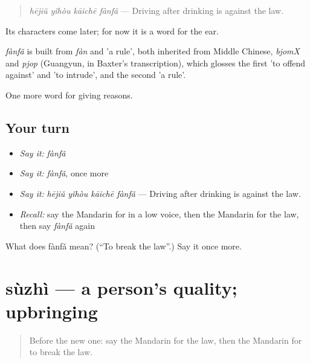 \begin{quote}
\emph{hējiǔ yǐhòu kāichē fànfǎ} — Driving after drinking is against the law.
\end{quote}

Its characters come later; for now it is a word for the ear.

\begin{cousinweb}
\emph{fànfǎ} is built from \emph{fàn} and  'a rule', both inherited from Middle Chinese, \emph{bjomX} and \emph{pjop} (Guangyun, in Baxter's transcription), which glosses the first 'to offend against' and 'to intrude', and the second 'a rule'.
\end{cousinweb}

\begin{grammarlens}[title={What you've built}]
One more word for giving reasons.
\end{grammarlens}

\subsection*{Your turn}
\begin{itemize}
\raggedright
  \item \emph{Say it:} \emph{fànfǎ}
  \item \emph{Say it:} \emph{fànfǎ}, once more
  \item \emph{Say it:} \emph{hējiǔ yǐhòu kāichē fànfǎ} — Driving after drinking is against the law.
  \item \emph{Recall:} say the Mandarin for in a low voice, then the Mandarin for the law, then say \emph{fànfǎ} again
\end{itemize}

\begin{tcolorbox}[breakable,colback=teal!4,colframe=teal!35!black,title={Before you move on}]
What does fànfǎ mean? (\textquotedblleft{}To break the law\textquotedblright{}.) Say it once more.
\end{tcolorbox}
\section[sùzhì]{sùzhì — a person's quality; upbringing}

\label{lesson:ZH-C363-suzhi}



\begin{quote}
Before the new one: say the Mandarin for the law, then the Mandarin for to break the law.
\end{quote}


